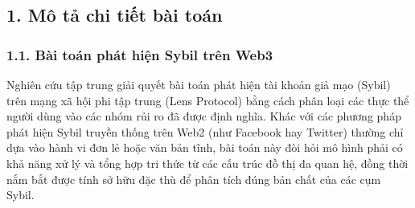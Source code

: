 \subsection{1. Mô tả chi tiết bài toán}
\subsubsection{1.1. Bài toán phát hiện Sybil trên Web3}
\indent\indent Nghiên cứu tập trung giải quyết bài toán phát hiện tài khoản giả mạo (Sybil) trên mạng xã hội phi tập trung (Lens Protocol) bằng cách phân loại các thực thể người dùng vào các nhóm rủi ro đã được định nghĩa. Khác với các phương pháp phát hiện Sybil truyền thống trên Web2 (như Facebook hay Twitter) thường chỉ dựa vào hành vi đơn lẻ hoặc văn bản tĩnh, bài toán này đòi hỏi mô hình phải có khả năng xử lý và tổng hợp tri thức từ các cấu trúc đồ thị đa quan hệ, đồng thời nắm bắt được tính sở hữu đặc thù để phân tích đúng bản chất của các cụm Sybil.\vspace{0.3cm}

